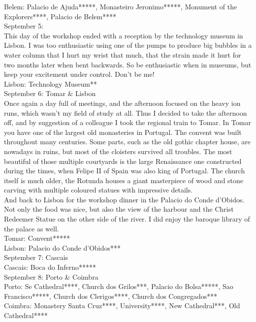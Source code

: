 Belem: Palacio de Ajuda*****, Monasteiro Jeronimo*****, Monument of the Explorers****, Palacio de Belem****\\

September 5:\\
This day of the workshop ended with a reception by the technology museum in Lisbon. I was too enthusiastic using one of the pumps to produce big bubbles in a water column that I hurt my wrist that much, that the strain made it hurt for two months later when bent backwards. So be enthusiastic when in museums, but keep your excitement under control. Don't be me!\\

Lisbon: Technology Museum**\\

September 6: Tomar \& Lisbon\\
Once again a day full of meetings, and the afternoon focused on the heavy ion runs, which wasn't my field of study at all. Thus I decided to take the afternoon off, and by suggestion of a colleague I took the regional train to Tomar. In Tomar you have one of the largest old monasteries in Portugal. The convent was built throughout many centuries. Some parts, such as the old gothic chapter house, are nowadays in ruins, but most of the cloisters survived all troubles. The most beautiful of those multiple courtyards is the large Renaissance one constructed during the times, when Felipe II of Spain was also king of Portugal. The church itself is much older, the Rotunda houses a giant masterpiece of wood and stone carving with multiple coloured statues with impressive details. \\
And back to Lisbon for the workshop dinner in the Palacio do Conde d'Obidos. Not only the food was nice, but also the view of the harbour and the Christ Redeemer Statue on the other side of the river. I did enjoy the baroque library of the palace as well.\\

Tomar: Convent*****\\
Lisbon: Palacio do Conde d'Obidos***\\

September 7: Cascais\\
Cascais: Boca do Inferno*****\\

September 8: Porto \& Coimbra\\
Porto: Se Cathedral****, Church dos Grilos***, Palacio do Bolsa*****, Sao Francisco*****, Church dos Clerigos****, Church dos Congregados***\\
Coimbra: Monastery Santa Cruz****, University****, New Cathedral***, Old Cathedral****\\

